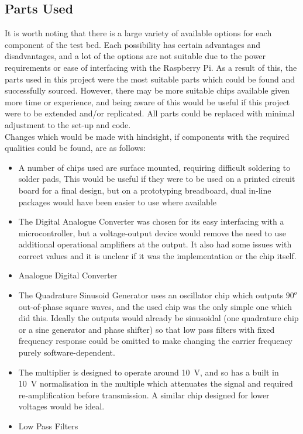 \documentclass[../main.tex]{subfiles}
\begin{document}
\subsection{Parts Used}

It is worth noting that there is a large variety of available options for each component of the test bed.
Each possibility has certain advantages and disadvantages, and a lot of the options are not suitable due to the power requirements or ease of interfacing with the Raspberry Pi.
As a result of this, the parts used in this project were the most suitable parts which could be found and successfully sourced.
However, there may be more suitable chips available given more time or experience, and being aware of this would be useful if this project were to be extended and/or replicated.
All parts could be replaced with minimal adjustment to the set-up and code.\\

Changes which would be made with hindsight, if components with the required qualities could be found, are as follows:

\begin{itemize}
	\item A number of chips used are surface mounted, requiring difficult soldering to solder pads, This would be useful if they were to be used on a printed circuit board for a final design, but on a prototyping breadboard, dual in-line packages would have been easier to use where available
	\item The Digital Analogue Converter was chosen for its easy interfacing with a microcontroller, but a voltage-output device would remove the need to use additional operational amplifiers at the output. It also had some issues with correct values and it is unclear if it was the implementation or the chip itself.
	\item Analogue Digital Converter
	\item The Quadrature Sinusoid Generator uses an oscillator chip which outputs $90^o$ out-of-phase square waves, and the used chip was the only simple one which did this. Ideally the outputs would already be sinusoidal (one quadrature chip or a sine generator and phase shifter) so that low pass filters with fixed frequency response could be omitted to make changing the carrier frequency purely software-dependent.
	\item The multiplier is designed to operate around \SI{10}{\volt}, and so has a built in \SI{10}{\volt} normalisation in the multiple which attenuates the signal and required re-amplification before transmission. A similar chip designed for lower voltages would be ideal.
	\item Low Pass Filters
\end{itemize}
\end{document}
